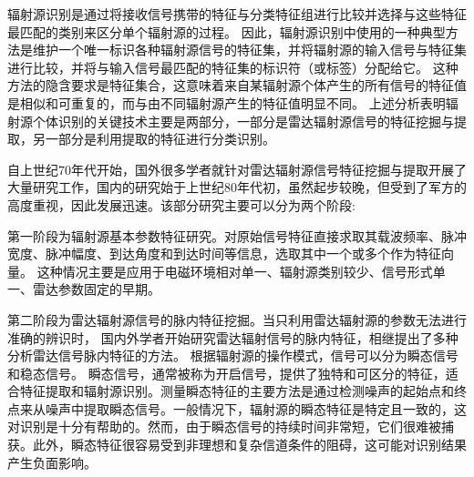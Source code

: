 辐射源识别是通过将接收信号携带的特征与分类特征组进行比较并选择与这些特征最匹配的类别来区分单个辐射源的过程。
因此，辐射源识别中使用的一种典型方法是维护一个唯一标识各种辐射源信号的特征集，并将辐射源的输入信号与特征集进行比较，并将与输入信号最匹配的特征集的标识符（或标签）分配给它。
这种方法的隐含要求是特征集合，这意味着来自某辐射源个体产生的所有信号的特征值是相似和可重复的，而与由不同辐射源产生的特征值明显不同。
上述分析表明辐射源个体识别的关键技术主要是两部分，一部分是雷达辐射源信号的特征挖掘与提取，另一部分是利用提取的特征进行分类识别。

自上世纪70年代开始，国外很多学者就针对雷达辐射源信号特征挖掘与提取开展了大量研究工作，国内的研究始于上世纪80年代初，虽然起步较晚，但受到了军方的高度重视，因此发展迅速。该部分研究主要可以分为两个阶段:

第一阶段为辐射源基本参数特征研究。对原始信号特征直接求取其载波频率、脉冲宽度、脉冲幅度、到达角度和到达时间等信息，选取其中一个或多个作为特征向量。
这种情况主要是应用于电磁环境相对单一、辐射源类别较少、信号形式单一、雷达参数固定的早期。

第二阶段为雷达辐射源信号的脉内特征挖掘。当只利用雷达辐射源的参数无法进行准确的辨识时，
国内外学者开始研究雷达辐射信号的脉内特征，相继提出了多种分析雷达信号脉内特征的方法。
根据辐射源的操作模式，信号可以分为瞬态信号和稳态信号。
瞬态信号，通常被称为开启信号，提供了独特和可区分的特征，适合特征提取和辐射源识别。测量瞬态特征的主要方法是通过检测噪声的起始点和终点来从噪声中提取瞬态信号。一般情况下，辐射源的瞬态特征是特定且一致的，这对识别是十分有帮助的。然而，由于瞬态信号的持续时间非常短，它们很难被捕获。此外，瞬态特征很容易受到非理想和复杂信道条件的阻碍，这可能对识别结果产生负面影响。

